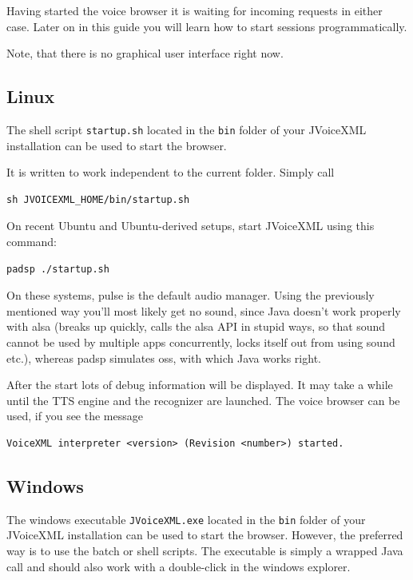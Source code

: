 \documentclass[11pt,a4paper]{book}
\begin{document}
Having started the voice browser it is waiting for incoming requests in either
case. Later on in this guide you will learn how to start sessions
programmatically.

Note, that there is no graphical user interface right now. 

\subsection{Linux}

The shell script \texttt{startup.sh} located in the \texttt{bin} folder
of your JVoiceXML installation can be used to start the browser.

It is written to work independent to the current folder. Simply call

\begin{lstlisting}
sh JVOICEXML_HOME/bin/startup.sh
\end{lstlisting}

On recent Ubuntu and Ubuntu-derived setups, start JVoiceXML using this command:
\begin{lstlisting}
padsp ./startup.sh
\end{lstlisting}

On these systems, pulse is the default audio manager. Using the previously
mentioned way you'll most likely get no
sound, since Java doesn't work properly with alsa (breaks up quickly, calls
the alsa API in stupid ways, so that sound cannot be used by multiple apps
concurrently, locks itself out from using sound etc.), whereas padsp simulates
oss, with which Java works right.


After the start lots of debug information will be displayed.
It may take a while until the TTS engine and the recognizer are launched.
The voice browser can be used, if you see the message

\begin{lstlisting}
VoiceXML interpreter <version> (Revision <number>) started.
\end{lstlisting}

\subsection{Windows}

The windows executable \texttt{JVoiceXML.exe} located in the \texttt{bin}
folder of your JVoiceXML installation can be used to start the browser.
However, the preferred way is to use the batch or shell scripts.
The executable is simply a wrapped Java call and should also work with a
double-click in the windows explorer.
\end{document}

